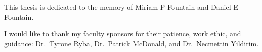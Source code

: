 
\begin{dedication}
  This thesis is dedicated to the memory of Miriam P Fountain and Daniel E Fountain.
\end{dedication}

\begin{acknowledgements}
I would like to thank my faculty sponsors for their patience, work ethic, and guidance:  Dr.\ Tyrone Ryba, Dr.\ Patrick McDonald,
and Dr.\ Necmettin Yildirim.
\end{acknowledgements}

